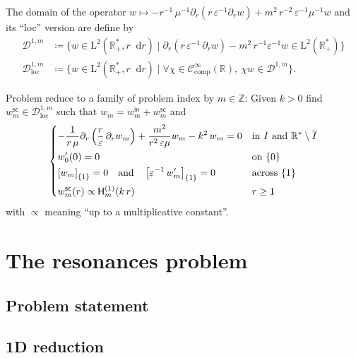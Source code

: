 \documentclass[12pt,a4paper]{article}
\newcommand{\bbR}{\mathbb{R}}
\newcommand{\bbZ}{\mathbb{Z}}
\newcommand{\calD}{\mathcal{D}}
\newcommand{\scrC}{\mathscr{C}}
\newcommand{\rmL}{\mathrm{L}}
\newcommand{\Hu}{\mathop{}\!\mathsf{H}^{(1)}}
\newcommand{\di}[1]{\mathop{}\!\mathrm{d}#1}
\newcommand{\plr}[1]{\left(#1\right)}
\newcommand{\clr}[1]{\left[#1\right]}
\newcommand{\eps}{\varepsilon}
\newcommand{\comp}{\mathrm{comp}}
\newcommand{\loc}{\mathrm{loc}}
\newcommand{\inc}{\mathsf{in}}
\newcommand{\sca}{\mathsf{sc}}
\begin{document}
The domain of the operator $w \mapsto -r^{-1}\, \mu^{-1} \partial_r(r\, \eps^{-1} \partial_r w) + m^2\, r^{-2}\, \eps^{-1}\mu^{-1} w$ and its ``loc'' version are define by
\begin{align*}
    \calD^{1, m} &\coloneqq \{w \in \rmL^2(\bbR_+^*, r\di{r}) \mid \partial_r(r\, \eps^{-1}\, \partial_r w) - m^2\, r^{-1}\eps^{-1} w \in \rmL^2(\bbR_+^*)\}\\
    \calD^{1, m}_\loc &\coloneqq \{w \in \rmL^2(\bbR_+^*, r\di{r}) \mid \forall \chi \in \scrC_\comp^\infty(\bbR),\ \chi w \in \calD^{1, m}\}.
\end{align*}

Problem reduce to a family of problem index by $m \in \bbZ$: Given $k > 0$ find $w_m^\sca \in \calD^{1, m}_\loc$ such that $w_m = w_m^\inc + w_m^\sca$ and
\begin{equation}\label{prob:w_scattering}
     \begin{dcases}
        -\frac{1}{r\, \mu} \partial_r\plr{\frac{r}{\eps}\, \partial_r w_m} + \dfrac{m^2}{r^2\, \eps\mu} w_m - k^2\, w_m = 0 & \text{in } I \text{ and } \bbR^* \setminus \overline{I}      \\
        w_0'(0) = 0 & \text{on } \{0\}       \\
        \clr{w_m}_{\{1\}} = 0 \quad\text{and}\quad \clr{\eps^{-1}\, w_m'}_{\{1\}} = 0              & \text{across } \{1\}   \\
        w_m^\sca(r) \propto \Hu_m(k\, r)                                                              & r \ge 1
    \end{dcases}
\end{equation}
with $\propto$ meaning ``up to a multiplicative constant''.

\section{The resonances problem}

\subsection{Problem statement}

\subsection{1D reduction}
\end{document}
